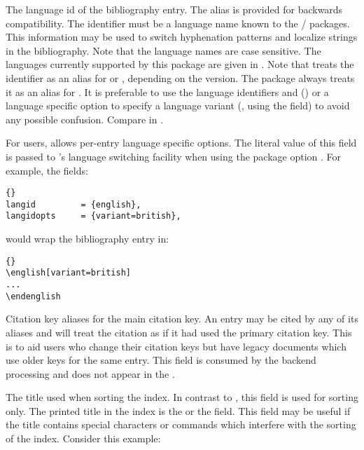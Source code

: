 \documentclass{ltxdockit}[2011/03/25]
\begin{document}
\begin{fieldlist}

The language id of the bibliography entry. The alias  is provided for backwards compatibility. The identifier must be a language name known to the / packages. This information may be used to switch hyphenation patterns and localize strings in the bibliography. Note that the language names are case sensitive. The languages currently supported by this package are given in . Note that  treats the identifier  as an alias for  or , depending on the  version. The  package always treats it as an alias for . It is preferable to use the language identifiers  and  () or a language specific option to specify a language variant (, using the  field) to avoid any possible confusion. Compare  in .


For  users, allows per-entry language specific options. The literal value of this field is passed to 's language switching facility when using the package option . For example, the fields:

\begin{lstlisting}[style=bibtex]{}
langid         = {english},
langidopts     = {variant=british},
\end{lstlisting}
%
would wrap the bibliography entry in:

\begin{lstlisting}[style=latex]{}
\english[variant=british]
...
\endenglish
\end{lstlisting}
%


Citation key aliases for the main citation key. An entry may be cited by any of its aliases and  will treat the citation as if it had used the primary citation key. This is to aid users who change their citation keys but have legacy documents which use older keys for the same entry. This field is consumed by the backend processing and does not appear in the .


The title used when sorting the index. In contrast to , this field is used for sorting only. The printed title in the index is the  or the  field. This field may be useful if the title contains special characters or commands which interfere with the sorting of the index. Consider this example:


\end{fieldlist}
\end{document}
